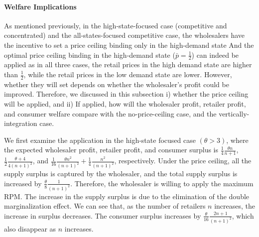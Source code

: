\documentclass[12pt]{article}
\begin{document}
\paragraph{Welfare Implications}
As mentioned previously, in the high-state-focused case (competitive and concentrated) and the all-states-focused competitive case, the wholesalers have the incentive to set a price ceiling binding only in the high-demand state And the optimal price ceiling binding in the high-demand state ($\bar{p} = \frac{1}{2}$) can indeed be applied as in all three cases, the retail prices in the high demand state are higher than $\frac{1}{2}$, while the retail prices in the low demand state are lower. However, whether they will set depends on whether the wholesaler's profit could be improved. Therefore, we discussed in this subsection i) whether the price ceiling will be applied, and ii) If applied, how will the wholesaler profit, retailer profit, and consumer welfare compare with the no-price-ceiling case, and the vertically-integration case. 

We first examine the application in the high-state focused case $(\theta > 3)$, where the expected wholesaler profit, retailer profit, and consumer surplus is  $\frac{1}{4}\frac{\theta n}{n + 1}$, $\frac{1}{2}\frac{\theta + 4}{4(n+1)^2}$, and $\frac{1}{16}\frac{\theta n^2}{(n+1)^2} + \frac{1}{4}\frac{n^2}{(n+1)^2}$, respectively. 
Under the price ceiling, all the supply surplus is captured by the wholesaler, and the total supply surplus is increased by $\frac{\theta}{8}\frac{1}{(n + 1)^2}$. 
Therefore, the wholesaler is willing to apply the maximum RPM. The increase in the supply surplus is due to the elimination of the double marginalization effect. We can see that, as the number of retailers $n$ increases, the increase in surplus decreases. The consumer surplus increases by $\frac{\theta}{16}\frac{2n + 1}{(n + 1)^2}$, which also disappear as $n$ increases.
\end{document}

